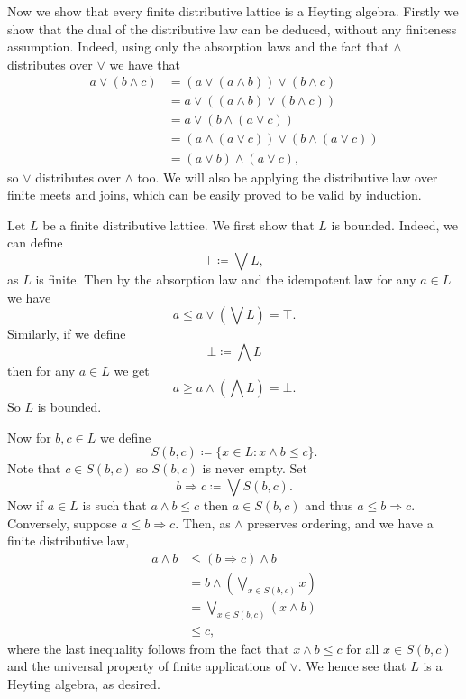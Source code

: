\documentclass{article}
\theoremstyle{plain}
\begin{document}
\begin{enumerate}
		Now we show that every finite distributive lattice is a Heyting algebra. Firstly we show that the dual of the distributive law can be deduced, without any finiteness assumption. Indeed, using only the absorption laws and the fact that $\wedge$ distributes over $\vee$ we have that
		\begin{align*}
			a\vee (b\wedge c) &= (a\vee (a\wedge b)) \vee (b\wedge c)\\
			&= a \vee ((a\wedge b) \vee (b\wedge c))\\
			&= a \vee (b \wedge (a \vee c))\\
			&= (a \wedge (a\vee c)) \vee (b \wedge (a \vee c))\\
			&= (a\vee b) \wedge (a\vee c),
		\end{align*}
		so $\vee$ distributes over $\wedge$ too. We will also be applying the distributive law over finite meets and joins, which can be easily proved to be valid by induction.		
		
		Let $L$ be a finite distributive lattice. We first show that $L$ is bounded. Indeed, we can define
		\[
			\top \coloneqq \bigvee L,
		\]
		as $L$ is finite. Then by the absorption law and the idempotent law for any $a\in L$ we have
		\[
			a \leq a \vee \left(\bigvee L\right) = \top.
		\]
		Similarly, if we define
		\[
			\bot \coloneqq \bigwedge L
		\]
		then for any $a\in L$ we get
		\[
			a \geq a\wedge \left(\bigwedge L\right) = \bot.
		\]
		So $L$ is bounded. 
		
		Now for $b,c \in L$ we define
		\[
			S(b,c) \coloneqq \{x\in L \colon x\wedge b \leq c\}.
		\]
		Note that $c\in S(b,c)$ so $S(b,c)$ is never empty. Set
		\[
			b\Rightarrow c \coloneqq \bigvee S(b,c).
		\]	
		Now if $a\in L$ is such that $a\wedge b \leq c$ then $a\in S(b,c)$ and thus $a\leq b\Rightarrow c$. Conversely, suppose $a\leq b\Rightarrow c$. Then, as $\wedge$ preserves ordering, and we have a finite distributive law,
		\begin{align*}
			a\wedge b &\leq (b\Rightarrow c) \wedge b\\
			&= b\wedge \left(\bigvee_{x\in S(b,c)} x\right)\\
			&= \bigvee_{x\in S(b,c)}  (x\wedge b)\\
			&\leq c,
		\end{align*}
		where the last inequality follows from the fact that $x\wedge b \leq c$ for all $x\in S(b,c)$ and the universal property of finite applications of $\vee$. We hence see that $L$ is a Heyting algebra, as desired.
		

\end{enumerate}
\end{document}
